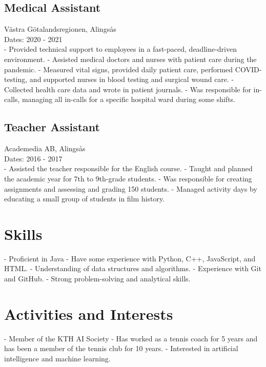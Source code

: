 \documentclass{article}
\begin{document}
\subsection*{Medical Assistant}
Västra Götalandsregionen, Alingsås \\
Dates: 2020 - 2021 \\
- Provided technical support to employees in a fast-paced, deadline-driven environment.
- Assisted medical doctors and nurses with patient care during the pandemic.
- Measured vital signs, provided daily patient care, performed COVID-testing, and supported nurses in blood testing and surgical wound care.
- Collected health care data and wrote in patient journals.
- Was responsible for in-calls, managing all in-calls for a specific hospital ward during some shifts.

\subsection*{Teacher Assistant}
Academedia AB, Alingsås \\
Dates: 2016 - 2017 \\
- Assisted the teacher responsible for the English course.
- Taught and planned the academic year for 7th to 9th-grade students.
- Was responsible for creating assignments and assessing and grading 150 students.
- Managed activity days by educating a small group of students in film history.

\section*{Skills}
- Proficient in Java
- Have some experience with Python, C++, JavaScript, and HTML.
- Understanding of data structures and algorithms.
- Experience with Git and GitHub.
- Strong problem-solving and analytical skills.

\section*{Activities and Interests}
- Member of the KTH AI Society
- Has worked as a tennis coach for 5 years and has been a member of the tennis club for 10 years.
- Interested in artificial intelligence and machine learning.
\end{document}
